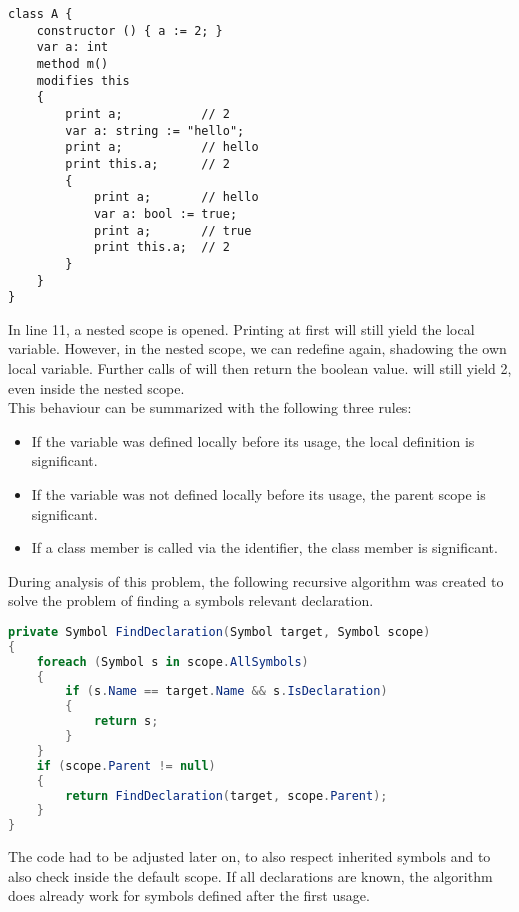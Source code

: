 \begin{lstlisting}[language = dafny, caption={Complex Shadowing Example}, captionpos=b, label={lst:shadowing}]
class A {
    constructor () { a := 2; }
    var a: int
    method m()
    modifies this
    {
        print a;           // 2
        var a: string := "hello";
        print a;           // hello
        print this.a;      // 2
        {
            print a;       // hello
            var a: bool := true;
            print a;       // true
            print this.a;  // 2
        }
    }
}
\end{lstlisting}

In line 11, a nested scope is opened.
Printing  at first will still yield the local variable.
However, in the nested scope, we can redefine  again, shadowing the own local variable.
Further calls of  will then return the boolean value.
 will still yield 2, even inside the nested scope.\\

This behaviour can be summarized with the following three rules:
\begin{itemize}
    \item If the variable was defined locally before its usage, the local definition is significant.
    \item If the variable was not defined locally before its usage, the parent scope is significant.
    \item If a class member is called via the  identifier, the class member is significant.
\end{itemize}

During analysis of this problem, the following recursive algorithm was created to solve the problem of finding a symbols relevant declaration.

\begin{lstlisting}[language=csharp, caption={Finding Symbol Definition}, captionpos=b, label={lst:findsymbol}]
private Symbol FindDeclaration(Symbol target, Symbol scope)
{
    foreach (Symbol s in scope.AllSymbols)
    {
        if (s.Name == target.Name && s.IsDeclaration)
        {
            return s;
        }
    }
    if (scope.Parent != null)
    {
        return FindDeclaration(target, scope.Parent);
    }
}
\end{lstlisting}
The code had to be adjusted later on, to also respect inherited symbols and to also check inside the default scope.
If all declarations are known, the algorithm does already work for symbols defined after the first usage.


